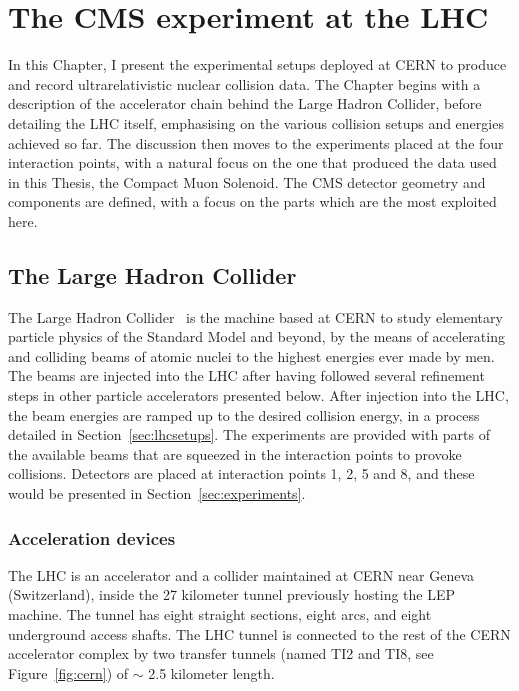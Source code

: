 \chapter{The CMS experiment at the LHC}
\label{chap:xlhcms}
\minitoc
{}


In this Chapter, I present the experimental setups
deployed at CERN to produce and record ultrarelativistic nuclear
collision data. The Chapter begins with a description of the
accelerator chain behind the Large Hadron Collider, before detailing the LHC itself,
emphasising on the various collision setups and energies achieved so
far. The discussion then moves to the experiments placed at the four
interaction points, with a natural focus on the one that produced the
data used in this Thesis, the Compact Muon Solenoid. The CMS detector
geometry and components are defined, with a focus on the parts which
are the most exploited here.



\section{The Large Hadron Collider}
The Large Hadron Collider~\cite{Evans:2008zzb} is the machine based at
CERN to study elementary particle physics of the Standard Model and beyond, by
the means of accelerating and colliding beams of atomic nuclei to the highest
energies ever made by men. The beams are injected into the LHC
after having followed several refinement steps in other particle accelerators
presented below. After injection into the LHC,
the beam energies are ramped up to the desired collision energy, in a
process detailed in Section~\ref{sec:lhcsetups}. The experiments are
provided with parts of the available beams that are squeezed in the
interaction points to provoke collisions. Detectors are placed at interaction points 1, 2,
5 and 8, and these would be presented in Section~\ref{sec:experiments}.
\subsection{Acceleration devices}
\label{sec:accdev}

The LHC is an accelerator and a collider maintained at CERN near
Geneva (Switzerland), inside the 27 kilometer tunnel previously hosting
the LEP machine. The tunnel has eight straight sections, eight
arcs, and eight underground access shafts. The LHC tunnel is connected
to the rest of the CERN accelerator complex by two transfer tunnels
(named TI2 and TI8, see Figure~\ref{fig:cern}) of $\sim$ 2.5 kilometer length.

